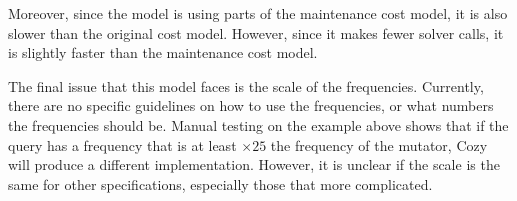 Moreover, since the model is using parts of the maintenance cost model, it is
also slower than the original cost model. However, since it makes fewer solver
calls, it is slightly faster than the maintenance cost model.

The final issue that this model faces is the scale of the frequencies. Currently,
there are no specific guidelines on how to use the frequencies, or what numbers
the frequencies should be. Manual testing on the example above shows that if the
query has a frequency that is at least $\times 25$ the frequency of the mutator,
Cozy will produce a different implementation. However, it is unclear if the
scale is the same for other specifications, especially those that more
complicated.

